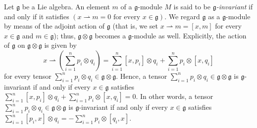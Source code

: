 \documentclass[etingof-lie.tex]{subfiles}
\begin{document}
\begin{remark}
Let $\mathfrak{g}$ be a Lie algebra. An element $m$ of a $\mathfrak{g}$-module
$M$ is said to be $\mathfrak{g}$\textit{-invariant} if and only if it
satisfies $\left(  x\rightharpoonup m=0\text{ for every }x\in\mathfrak{g}%
\right)  $. We regard $\mathfrak{g}$ as a $\mathfrak{g}$-module by means of
the adjoint action of $\mathfrak{g}$ (that is, we set $x\rightharpoonup
m=\left[  x,m\right]  $ for every $x\in\mathfrak{g}$ and $m\in\mathfrak{g}$);
thus, $\mathfrak{g}\otimes\mathfrak{g}$ becomes a $\mathfrak{g}$-module as
well. Explicitly, the action of $\mathfrak{g}$ on $\mathfrak{g}\otimes
\mathfrak{g}$ is given by%
\[
x\rightharpoonup\left(  \sum\limits_{i=1}^{n}p_{i}\otimes q_{i}\right)
=\sum\limits_{i=1}^{n}\left[  x,p_{i}\right]  \otimes q_{i}+\sum
\limits_{i=1}^{n}p_{i}\otimes\left[  x,q_{i}\right]
\]
for every tensor $\sum\limits_{i=1}^{n}p_{i}\otimes q_{i}\in\mathfrak{g}%
\otimes\mathfrak{g}$. Hence, a tensor $\sum\limits_{i=1}^{n}p_{i}\otimes
q_{i}\in\mathfrak{g}\otimes\mathfrak{g}$ is $\mathfrak{g}$-invariant if and
only if every $x\in\mathfrak{g}$ satisfies $\sum\limits_{i=1}^{n}\left[
x,p_{i}\right]  \otimes q_{i}+\sum\limits_{i=1}^{n}p_{i}\otimes\left[
x,q_{i}\right]  =0$. In other words, a tensor $\sum\limits_{i=1}^{n}%
p_{i}\otimes q_{i}\in\mathfrak{g}\otimes\mathfrak{g}$ is $\mathfrak{g}%
$-invariant if and only if every $x\in\mathfrak{g}$ satisfies $\sum
\limits_{i=1}^{n}\left[  p_{i},x\right]  \otimes q_{i}=-\sum\limits_{i=1}%
^{n}p_{i}\otimes\left[  q_{i},x\right]  $.
\end{remark}
\end{document}
